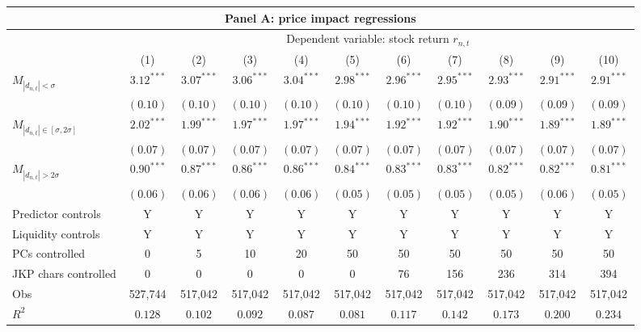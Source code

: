 \begin{tabular}{lcccccccccc}
  \hline \multicolumn{11}{c}{Panel A: price impact regressions} \\
 \hline
                                    & \multicolumn{10}{c}{Dependent variable: stock return $r_{n,t}$} \\

                                    \cmidrule(l){2-11}  
  & (1) & (2) & (3) & (4) & (5) & (6) & (7) & (8) & (9) & (10) \\ 
  $M_{|d_{n,t}| < \sigma}$ & $3.12^{***}$ & $3.07^{***}$ & $3.06^{***}$ & $3.04^{***}$ & $2.98^{***}$ & $2.96^{***}$ & $2.95^{***}$ & $2.93^{***}$ & $2.91^{***}$ & $2.91^{***}$ \\ 
   & $(0.10)$ & $(0.10)$ & $(0.10)$ & $(0.10)$ & $(0.10)$ & $(0.10)$ & $(0.10)$ & $(0.09)$ & $(0.09)$ & $(0.09)$ \\ 
  $M_{|d_{n,t}| \in [\sigma, 2\sigma]}$ & $2.02^{***}$ & $1.99^{***}$ & $1.97^{***}$ & $1.97^{***}$ & $1.94^{***}$ & $1.92^{***}$ & $1.92^{***}$ & $1.90^{***}$ & $1.89^{***}$ & $1.89^{***}$ \\ 
   & $(0.07)$ & $(0.07)$ & $(0.07)$ & $(0.07)$ & $(0.07)$ & $(0.07)$ & $(0.07)$ & $(0.07)$ & $(0.07)$ & $(0.07)$ \\ 
  $M_{|d_{n,t}| > 2 \sigma}$ & $0.90^{***}$ & $0.87^{***}$ & $0.86^{***}$ & $0.86^{***}$ & $0.84^{***}$ & $0.83^{***}$ & $0.83^{***}$ & $0.82^{***}$ & $0.82^{***}$ & $0.81^{***}$ \\ 
   & $(0.06)$ & $(0.06)$ & $(0.06)$ & $(0.06)$ & $(0.05)$ & $(0.05)$ & $(0.05)$ & $(0.05)$ & $(0.06)$ & $(0.05)$ \\ 
  Predictor controls & Y & Y & Y & Y & Y & Y & Y & Y & Y & Y \\ 
   \vspace{5pt}Liquidity controls & Y & Y & Y & Y & Y & Y & Y & Y & Y & Y \\ 
  PCs controlled & 0 & 5 & 10 & 20 & 50 & 50 & 50 & 50 & 50 & 50 \\ 
   \vspace{5pt}JKP chars controlled & 0 & 0 & 0 & 0 & 0 & 76 & 156 & 236 & 314 & 394 \\ 
  Obs & 527,744 & 517,042 & 517,042 & 517,042 & 517,042 & 517,042 & 517,042 & 517,042 & 517,042 & 517,042 \\ 
   \vspace{5pt}$R^2$ & $0.128$ & $0.102$ & $0.092$ & $0.087$ & $0.081$ & $0.117$ & $0.142$ & $0.173$ & $0.200$ & $0.234$ \\ 

\end{tabular}
